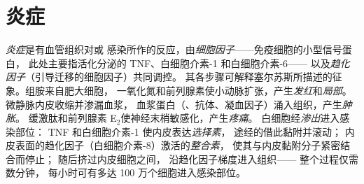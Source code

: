 \section{炎症}

\begin{definition}[急性炎症]\label{def:b3:innate-immunity:inflammation}
\emph{炎症}是有血管组织对或
感染所作的反应，由\emph{细胞因子}——免疫细胞的小型信号蛋白，
此处主要指活化分泌的 TNF、白细胞介素-1 和白细胞介素-6——
以及\emph{趋化因子}（引导迁移的细胞因子）共同调控。
其各步骤可解释塞尔苏斯所描述的征象。组胺来自肥大细胞，
一氧化氮和前列腺素使小动脉扩张，产生\emph{发红}和\emph{局部}。
微静脉内皮收缩并渗漏血浆，
血浆蛋白（、抗体、凝血因子）涌入组织，产生\emph{肿胀}。
缓激肽和前列腺素 E$_{2}$使神经末梢敏感化，产生\emph{疼痛}。
白细胞经\emph{渗出}进入感染部位：
TNF 和白细胞介素-1 使内皮表达\emph{选择素}，
途经的借此黏附并滚动；
内皮表面的趋化因子（白细胞介素-8）激活的\emph{整合素}，
使其与内皮黏附分子紧密结合而停止；
随后挤过内皮细胞之间，
沿趋化因子梯度进入组织——
整个过程仅需数分钟，
每小时可有多达 100 万个细胞进入感染部位。
\end{definition}


